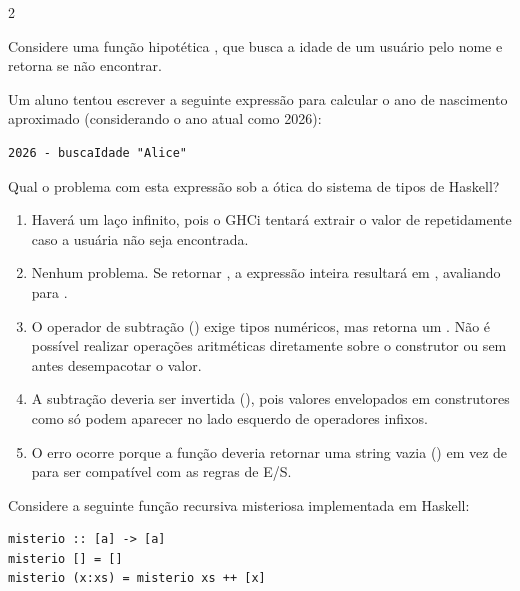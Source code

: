 \documentclass[a4paper,10pt,brazil]{article}
\begin{document}
\begin{multicols}{2}
\begin{enumerate}
\end{enumerate}

Considere uma função hipotética , que busca a idade de um usuário pelo nome e retorna  se não encontrar. 

Um aluno tentou escrever a seguinte expressão para calcular o ano de nascimento aproximado (considerando o ano atual como 2026):
\begin{verbatim}
2026 - buscaIdade "Alice"
\end{verbatim}

Qual o problema com esta expressão sob a ótica do sistema de tipos de Haskell?

\begin{enumerate}
  \item Haverá um laço infinito, pois o GHCi tentará extrair o valor de  repetidamente caso a usuária não seja encontrada.

  \item Nenhum problema. Se  retornar , a expressão inteira resultará em , avaliando para .

  \item O operador de subtração (\haskellinline{-}) exige tipos numéricos, mas  retorna um . Não é possível realizar operações aritméticas diretamente sobre o construtor  ou  sem antes desempacotar o valor.

  \item A subtração deveria ser invertida (), pois valores envelopados em construtores como  só podem aparecer no lado esquerdo de operadores infixos.

  \item O erro ocorre porque a função  deveria retornar uma string vazia () em vez de  para ser compatível com as regras de E/S.


\end{enumerate}

Considere a seguinte função recursiva misteriosa implementada em Haskell:

\begin{verbatim}
misterio :: [a] -> [a]
misterio [] = []
misterio (x:xs) = misterio xs ++ [x]
\end{verbatim}


\end{multicols}
\end{document}
